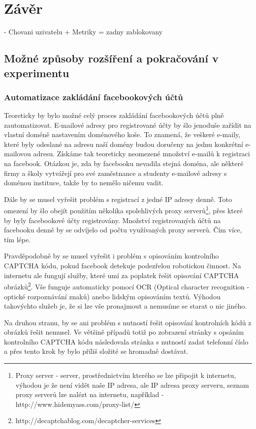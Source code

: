 \documentclass[thesis=M,czech]{FITthesis}[2013/05/10]
\begin{document}
\chapter{Z{\' a}v{\v e}r}

- Chovani uzivatelu + Metriky
= zadny zablokovany

\section{Možné způsoby rozšíření a pokračování v experimentu}

\subsection{Automatizace zakládání facebookových účtů}
Teoreticky by bylo možné celý proces zakládání facebookových účtů plně zautomatizovat. E-mailové adresy pro registrované účty by šlo jenoduše zařídit na vlastní doméně nastavením doménového koše. To znamená, že veškeré e-maily, které byly odeslané na adresu naší domény budou doručeny na jednu konkrétní e-mailovou adresu. Získáme tak teoreticky neomezené množství e-mailů k registraci na facebook. Otázkou je, zda by facebooku nevadila stejná doména, ale některé firmy a školy vytvářejí pro své zaměstnance a studenty e-mailové adresy s doménou instituce, takže by to nemělo ničemu vadit.

Dále by se musel vyřešit problém s registrací z jedné IP adresy denně. Toto omezení by šlo obejít použitím několika spolehlivých proxy serverů\footnote{Proxy server - server, prostřednictvím kterého se lze připojit k internetu, výhodou je že není vidět naše IP adresa, ale IP adresa proxy serveru, seznam proxy serverů lze nalézt na internetu, například - http://www.hidemyass.com/proxy-list/}, přes které by byly facebookové účty registrovány. Množství registrovaných účtů na facebooku denně by se odvíjelo od počtu využívaných proxy serverů. Čím více, tím lépe.

Pravděpodobně by se musel vyřešit i problém s opisováním kontrolního CAPTCHA kódu, pokud facebook detekuje podezřelou robotickou činnost. Na internetu ale fungují služby, které umí za poplatek řešit opisování CAPTCHA obrázků\footnote{http://decaptchablog.com/decaptcher-services}. Vše funguje automaticky pomocí OCR (Optical character recognition - optické rozpoznávání znaků) anebo lidským opisováním textů. Výhodou takovýchto služeb je, že si lze vše pronajmout a nemusíme se starat o nic jiného. 

Na druhou stranu, by se ani problém s nutností řešit opisování kontrolních kódů z obrázků řešit nemusel. Ve většině případů totiž po zobrazení stránky s opsáním kontrolního CAPTCHA kódu následovala stránka s nutností zadat telefonní číslo a přes tento krok by bylo příliš složité se hromadně dostávat.
\end{document}
